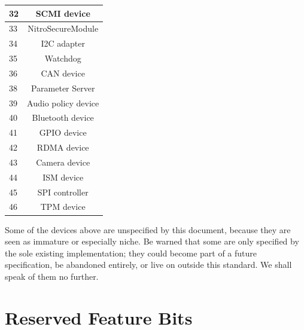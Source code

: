 \begin{tabular} { |l|c| }
\hline
32         &   SCMI device \\
\hline
33         &   NitroSecureModule \\
\hline
34         &   I2C adapter \\
\hline
35         &   Watchdog \\
\hline
36         &   CAN device \\
\hline
38         &   Parameter Server \\
\hline
39         &   Audio policy device \\
\hline
40         &   Bluetooth device \\
\hline
41         &   GPIO device \\
\hline
42         &   RDMA device \\
\hline
43         &   Camera device \\
\hline
44         &   ISM device \\
\hline
45         &   SPI controller \\
\hline
46         &   TPM device \\
\hline
\end{tabular}

Some of the devices above are unspecified by this document,
because they are seen as immature or especially niche.  Be warned
that some are only specified by the sole existing implementation;
they could become part of a future specification, be abandoned
entirely, or live on outside this standard.  We shall speak of
them no further.






















\chapter{Reserved Feature Bits}\label{sec:Reserved Feature Bits}

